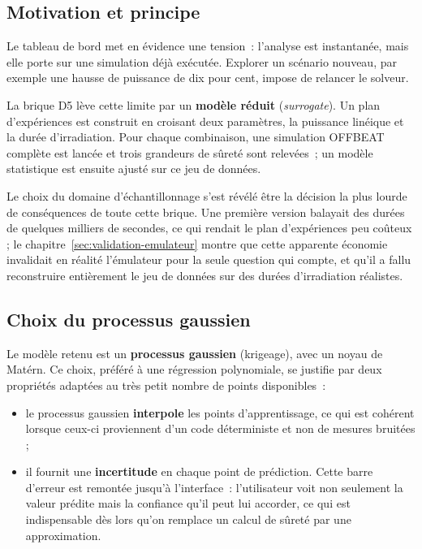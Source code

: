\documentclass[12pt,a4paper,french]{report}
\begin{document}
\subsection{Motivation et principe}

Le tableau de bord met en évidence une tension~: l'analyse est instantanée, mais
elle porte sur une simulation déjà exécutée. Explorer un scénario nouveau, par exemple une
hausse de puissance de dix pour cent, impose de relancer
le solveur.

La brique D5 lève cette limite par un \textbf{modèle réduit}
(\textit{surrogate}). Un plan d'expériences est construit en croisant deux
paramètres, la puissance linéique et la durée d'irradiation. Pour chaque
combinaison, une simulation OFFBEAT complète est lancée et trois grandeurs de
sûreté sont relevées~; un modèle statistique est ensuite ajusté sur ce jeu de
données.

Le choix du domaine d'échantillonnage s'est révélé être la décision la plus
lourde de conséquences de toute cette brique. Une première version balayait des
durées de quelques milliers de secondes, ce qui rendait le plan d'expériences
peu coûteux ; le chapitre~\ref{sec:validation-emulateur} montre que cette
apparente économie invalidait en réalité l'émulateur pour la seule question qui
compte, et qu'il a fallu reconstruire entièrement le jeu de données sur des
durées d'irradiation réalistes.

\subsection{Choix du processus gaussien}

Le modèle retenu est un \textbf{processus gaussien} (krigeage), avec un noyau de
Matérn. Ce choix, préféré à une régression polynomiale, se justifie par deux
propriétés adaptées au très petit nombre de points disponibles~:

\begin{itemize}
  \item le processus gaussien \textbf{interpole} les points d'apprentissage, ce
    qui est cohérent lorsque ceux-ci proviennent d'un code déterministe et non
    de mesures bruitées ;
  \item il fournit une \textbf{incertitude} en chaque point de prédiction. Cette
    barre d'erreur est remontée jusqu'à l'interface~: l'utilisateur voit non
    seulement la valeur prédite mais la confiance qu'il peut lui accorder, ce
    qui est indispensable dès lors qu'on remplace un calcul de sûreté par une
    approximation.
\end{itemize}
\end{document}

